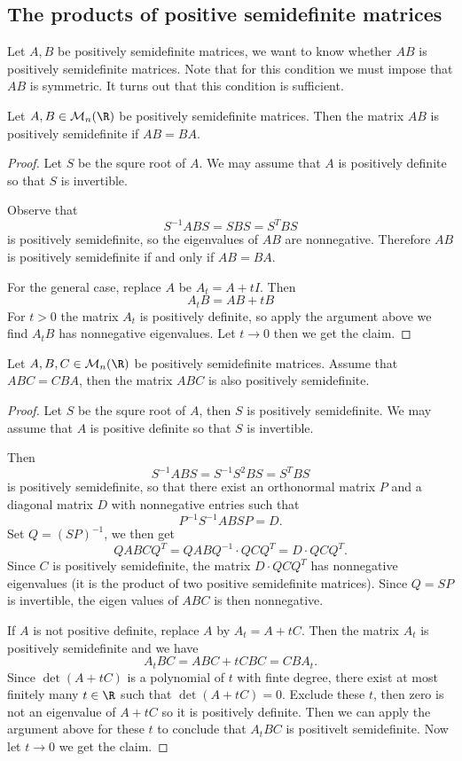 \subsection{The products of positive semidefinite matrices}
Let $A,B$ be positively semidefinite matrices, we want to know whether $AB$ is positively semidefinite matrices. Note that for this condition we must impose that $AB$ is symmetric. It turns out that this condition is sufficient.
\begin{proposition}\label{PSD product two}
Let $A,B\in\mathcal{M}_n(\R)$ be positively semidefinite matrices. Then the matrix $AB$ is positively semidefinite if $AB=BA$.
\end{proposition}
\begin{proof}
Let $S$ be the squre root of $A$. We may assume that $A$ is positively definite so that $S$ is invertible.\par
Observe that 
\[S^{-1}ABS=SBS=S^TBS\]
is positively semidefinite, so the eigenvalues of $AB$ are nonnegative. Therefore $AB$ is positively semidefinite if and only if $AB=BA$.\par
For the general case, replace $A$ be $A_t=A+tI$. Then
\[A_tB=AB+tB\]
For $t>0$ the matrix $A_t$ is positively definite, so apply the argument above we find $A_tB$ has nonnegative eigenvalues. Let $t\to 0$ then we get the claim. 
\end{proof}
\begin{proposition}\label{PSD product three}
Let $A,B,C\in\mathcal{M}_n(\R)$ be positively semidefinite matrices. Assume that $ABC=CBA$, then the matrix $ABC$ is also positively semidefinite.
\end{proposition}
\begin{proof}
Let $S$ be the squre root of $A$, then $S$ is positively semidefinite. We may assume that $A$ is positive definite so that $S$ is invertible.\par
Then 
\[S^{-1}ABS=S^{-1}S^2BS=S^TBS\]
is positively semidefinite, so that there exist an orthonormal matrix $P$ and a diagonal matrix $D$ with nonnegative entries such that
\[P^{-1}S^{-1}ABSP=D.\]
Set $Q=(SP)^{-1}$, we then get
\[QABCQ^T=QABQ^{-1}\cdot QCQ^T=D\cdot QCQ^T.\]
Since $C$ is positively semidefinite, the matrix $D\cdot QCQ^T$ has nonnegative eigenvalues (it is the product of two positive semidefinite matrices). Since $Q=SP$ is invertible, the eigen values of $ABC$ is then nonnegative.\par
If $A$ is not positive definite, replace $A$ by $A_t=A+tC$. Then the matrix $A_t$ is positively semidefinite and we have
\[A_tBC=ABC+tCBC=CBA_t.\]
Since $\det(A+tC)$ is a polynomial of $t$ with finte degree, there exist at most finitely many $t\in\R$ such that $\det(A+tC)=0$. Exclude these $t$, then zero is not an eigenvalue of $A+tC$ so it is positively definite. Then we can apply the argument above for these $t$ to conclude that $A_tBC$ is positivelt semidefinite. Now let $t\to 0$ we get the claim.
\end{proof}
